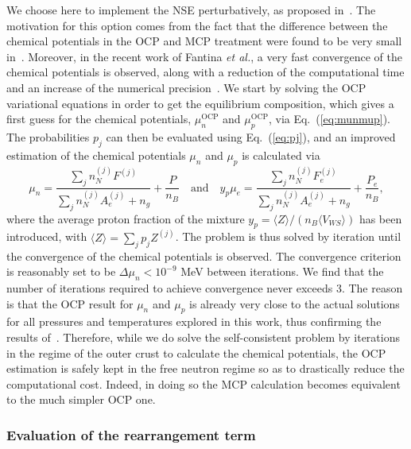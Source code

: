 We choose here to implement the NSE perturbatively, as proposed 
in~\cite{Grams2018}. 
The motivation for this option comes from the fact that the difference between
the chemical potentials in the OCP and MCP treatment were found to be very
small in~\cite{Gulminelli2015}. Moreover, in the recent work of Fantina 
\textit{et al.}, a very fast convergence of the chemical potentials is 
observed, along with a reduction of the computational time and an increase of
the numerical precision~\cite{Fantina2020}.
We start by solving the OCP variational equations in order to get the 
equilibrium composition, which gives a first guess for the chemical potentials,
$\mu_n^{\text{OCP}}$ and $\mu_p^{\text{OCP}}$, via Eq.~(\ref{eq:munmup}). 
The probabilities $p_j$ can then be evaluated using Eq.~(\ref{eq:pj}), and an
improved estimation of the chemical potentials $\mu_n$ and $\mu_p$ is
calculated via
%
\begin{equation}
  \mu_n = \frac{\sum_j n_N^{(j)}F^{(j)}}{\sum_j n_N^{(j)}A_e^{(j)} + n_g} +
  \frac{P}{n_B} \quad \text{and} \quad
  y_p\mu_e = \frac{\sum_j n_N^{(j)}F_e^{(j)}}{\sum_j n_N^{(j)}A_e^{(j)} + n_g} 
  + \frac{P_e}{n_B},
\end{equation}
%
where the average proton fraction of the mixture $y_p=\langle
Z\rangle/(n_B\langle V_{WS}\rangle)$ has been introduced, with 
$\langle Z \rangle = \sum_j p_j Z^{(j)}$. The problem is thus solved by
iteration until the convergence of the chemical potentials is observed. The
convergence criterion is reasonably set to be $\Delta \mu_n < 10^{-9}$ MeV
between iterations.
We find that the number of iterations required to achieve convergence never 
exceeds 3. The reason is that the OCP result for $\mu_n$ and $\mu_p$ is 
already very close to the actual solutions for all pressures and 
temperatures explored in this work, thus confirming the results
of~\cite{Gulminelli2015}. Therefore, while we do solve the 
self-consistent problem by iterations in the regime of the outer crust 
to calculate the chemical potentials, the OCP estimation is safely kept in 
the free neutron regime so as to drastically reduce the computational cost. 
Indeed, in doing so the MCP calculation becomes equivalent to the much simpler 
OCP one.

\subsubsection{Evaluation of the rearrangement term}\label{subsubsec:rear}

